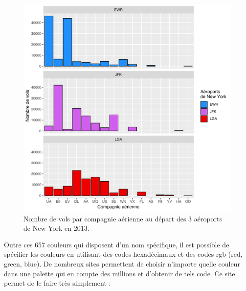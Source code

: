 \documentclass[a4paperpaper,]{article}
\newenvironment{Shaded}{\begin{snugshade}}{\end{snugshade}}
\newcommand{\KeywordTok}[1]{\textcolor[rgb]{0.13,0.29,0.53}{\textbf{#1}}}
\newcommand{\DataTypeTok}[1]{\textcolor[rgb]{0.13,0.29,0.53}{#1}}
\newcommand{\DecValTok}[1]{\textcolor[rgb]{0.00,0.00,0.81}{#1}}
\newcommand{\CharTok}[1]{\textcolor[rgb]{0.31,0.60,0.02}{#1}}
\newcommand{\StringTok}[1]{\textcolor[rgb]{0.31,0.60,0.02}{#1}}
\newcommand{\OperatorTok}[1]{\textcolor[rgb]{0.81,0.36,0.00}{\textbf{#1}}}
\newcommand{\NormalTok}[1]{#1}
\theoremstyle{definition}
\theoremstyle{definition}
\theoremstyle{definition}
\theoremstyle{remark}
\begin{document}
\begin{figure}[htpb]

{\centering \includegraphics[width=0.9\linewidth]{figure/barfacetmanual-1} 

}

\caption{Nombre de vols par compagnie aérienne au départ des 3 aéroports de New York en 2013.}\label{fig:barfacetmanual}
\end{figure}

Outre ces 657 couleurs qui disposent d'un nom spécifique, il est
possible de spécifier les couleurs en utilisant des codes hexadécimaux
et des codes rgb (red, green, blue). De nombreux sites permettent de
choisir n'importe quelle couleur dans une palette qui en compte des
millions et d'obtenir de tels code. \href{https://www.color-hex.com}{Ce
site} permet de le faire très simplement :

\begin{Shaded}
\end{Shaded}
\end{document}
